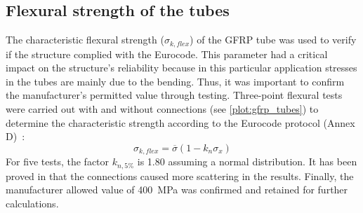 \subsection{Flexural strength of the tubes}\label{sec=flex}
The characteristic flexural strength ($\sigma_{k,flex}$) of the GFRP tube was used to verify if the structure complied with the Eurocode. This parameter had a critical impact on the structure’s reliability because in this particular application stresses in the tubes are mainly due to the bending. Thus, it was important to confirm the manufacturer’s permitted value through testing.
Three-point flexural tests were carried out with and without connections (see \cref{plot:gfrp_tubes}) to determine the characteristic strength according to the Eurocode protocol (Annex D)~:
\begin{equation}
\sigma_{k,flex}=\overline{\sigma}(1-k_n\sigma_x)
\end{equation}
For five tests, the factor $k_{n,5\%}$ is 1.80 assuming a normal distribution. It has been proved in \cite{Tayeb2015a} that the connections caused more scattering in the results. Finally, the manufacturer allowed value of \SI{400}{MPa} was confirmed and retained for further calculations.





